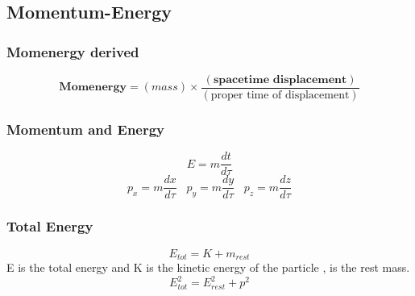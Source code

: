 \documentclass[12pt]{article}
\newcommand{\dydx}[2]{\frac{d #1}{d #2}}
\newcommand{\paren}[1]{\left( #1 \right)}
\begin{document}
\subsection{Momentum-Energy}
\subsubsection{Momenergy derived}
\[
\textbf{Momenergy} = \paren{mass}\times \frac{\paren{\textbf{spacetime displacement}}}{\paren{\text{proper time of displacement}}}
\]
\subsubsection{Momentum and Energy}
\[
E=m\dydx{t}{\tau}
\]
\[
p_x = m\dydx{x}{\tau}\;\;\; p_y = m\dydx{y}{\tau}\;\;\; p_z = m\dydx{z}{\tau}
\]
\subsubsection{Total Energy}
\[
E_{tot} = K + m_{rest}
\]
E is the total energy and K is the kinetic energy of the particle , is the rest mass.
\[
E_{tot}^2 = E_{rest}^2 + p^2
\]
\end{document}

